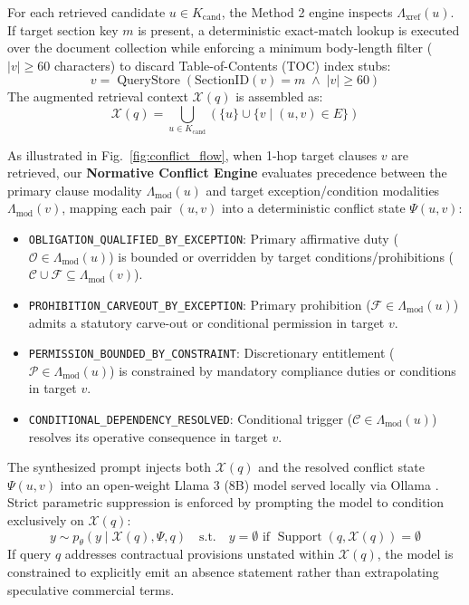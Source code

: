\documentclass[conference]{IEEEtran}
\begin{document}
For each retrieved candidate $u \in K_{\text{cand}}$, the Method 2 engine inspects $\Lambda_{\text{xref}}(u)$. If target section key $m$ is present, a deterministic exact-match lookup is executed over the document collection while enforcing a minimum body-length filter ($|v| \ge 60$ characters) to discard Table-of-Contents (TOC) index stubs:
\begin{equation}
v = \operatorname{QueryStore}\left( \text{SectionID}(v) = m \;\land\; |v| \ge 60 \right)
\end{equation}
The augmented retrieval context $\mathcal{X}(q)$ is assembled as:
\begin{equation}
\mathcal{X}(q) = \bigcup_{u \in K_{\text{cand}}} \left( \{u\} \cup \{v \mid (u, v) \in E\} \right)
\label{eq:context_assembly}
\end{equation}

As illustrated in Fig.~\ref{fig:conflict_flow}, when 1-hop target clauses $v$ are retrieved, our \textbf{Normative Conflict Engine} evaluates precedence between the primary clause modality $\Lambda_{\text{mod}}(u)$ and target exception/condition modalities $\Lambda_{\text{mod}}(v)$, mapping each pair $(u, v)$ into a deterministic conflict state $\Psi(u, v)$:
\begin{itemize}
    \item \texttt{OBLIGATION\_QUALIFIED\_BY\_EXCEPTION}: Primary affirmative duty ($\mathcal{O} \in \Lambda_{\text{mod}}(u)$) is bounded or overridden by target conditions/prohibitions ($\mathcal{C} \cup \mathcal{F} \subseteq \Lambda_{\text{mod}}(v)$).
    \item \texttt{PROHIBITION\_CARVEOUT\_BY\_EXCEPTION}: Primary prohibition ($\mathcal{F} \in \Lambda_{\text{mod}}(u)$) admits a statutory carve-out or conditional permission in target $v$.
    \item \texttt{PERMISSION\_BOUNDED\_BY\_CONSTRAINT}: Discretionary entitlement ($\mathcal{P} \in \Lambda_{\text{mod}}(u)$) is constrained by mandatory compliance duties or conditions in target $v$.
    \item \texttt{CONDITIONAL\_DEPENDENCY\_RESOLVED}: Conditional trigger ($\mathcal{C} \in \Lambda_{\text{mod}}(u)$) resolves its operative consequence in target $v$.
\end{itemize}
The synthesized prompt injects both $\mathcal{X}(q)$ and the resolved conflict state $\Psi(u, v)$ into an open-weight Llama 3 (8B) model served locally via Ollama \cite{dubey2024llama3}. Strict parametric suppression is enforced by prompting the model to condition exclusively on $\mathcal{X}(q)$:
\begin{equation}
y \sim p_\theta(y \mid \mathcal{X}(q), \Psi, q) \quad \text{s.t.} \quad y = \emptyset \text{ if } \operatorname{Support}(q, \mathcal{X}(q)) = \emptyset
\end{equation}
If query $q$ addresses contractual provisions unstated within $\mathcal{X}(q)$, the model is constrained to explicitly emit an absence statement rather than extrapolating speculative commercial terms.
\end{document}
